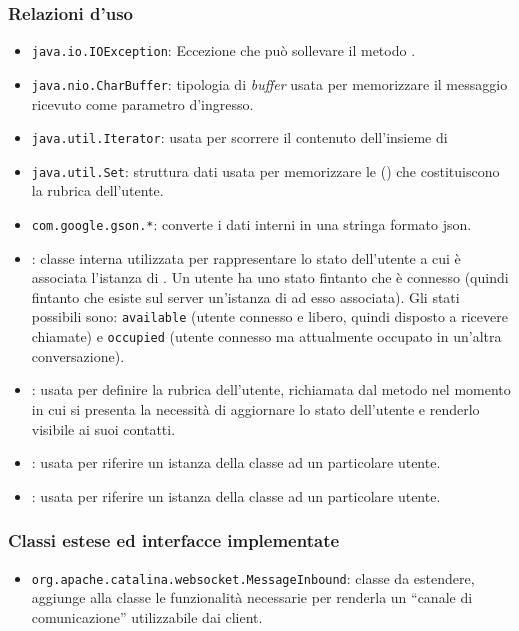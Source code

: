 \subsubsection*{Relazioni d'uso}
\begin{itemize}
	\item \texttt{java.io.IOException}: Eccezione che può sollevare il metodo .
	\item \texttt{java.nio.CharBuffer}: tipologia di \textit{buffer} usata per memorizzare il messaggio ricevuto come parametro d'ingresso.
	\item \texttt{java.util.Iterator}: usata per scorrere il contenuto dell'insieme di 
	\item \texttt{java.util.Set}: struttura dati usata per memorizzare le  () che costituiscono la rubrica dell'utente.
	\item \texttt{com.google.gson.*}: converte i dati interni in una stringa formato json.
	\item {}: classe interna utilizzata per rappresentare lo stato dell'utente a cui è associata l'istanza di . Un utente ha uno stato fintanto che è connesso (quindi fintanto che esiste sul server un'istanza di   ad esso associata). Gli stati possibili sono: \texttt{available} (utente connesso e libero, quindi disposto a ricevere chiamate) e \texttt{occupied} (utente connesso ma attualmente occupato in un'altra conversazione).
	\item {}: usata per definire la rubrica dell'utente, richiamata dal metodo  nel momento in cui si presenta la necessità di aggiornare lo stato dell'utente e renderlo visibile ai suoi contatti.
	\item {}: usata per riferire un istanza della classe ad un particolare utente.
	\item {}: usata per riferire un istanza della classe ad un particolare utente.

\end{itemize}

\subsubsection*{Classi estese ed interfacce implementate}
\begin{itemize}
	\item \texttt{org.apache.catalina.websocket.MessageInbound}: classe da estendere, aggiunge alla classe  le funzionalità necessarie per renderla un ``canale di comunicazione'' utilizzabile dai client.
\end{itemize}

